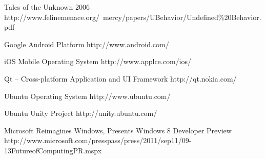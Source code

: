 \begin{thebibliography}{9}

		{Tales of the Unknown}
		{2006}
		{http://www.felinemenace.org/~mercy/papers/UBehavior/Undefined\%20Behavior.pdf}
	

		{Google Android Platform}
		{http://www.android.com/}
	
		{iOS Mobile Operating System}
		{http://www.applce.com/ios/}
		
		{Qt -- Cross-platform Application and UI Framework}
		{http://qt.nokia.com/}
	
		{Ubuntu Operating System}
		{http://www.ubuntu.com/}
		
		{Ubuntu Unity Project}
		{http://unity.ubuntu.com/}
	
		{Microsoft Reimagines Windows, Presents Windows 8 Developer Preview}
		{http://www.microsoft.com/presspass/press/2011/sep11/09-13FutureofComputingPR.mspx}

\end{thebibliography}